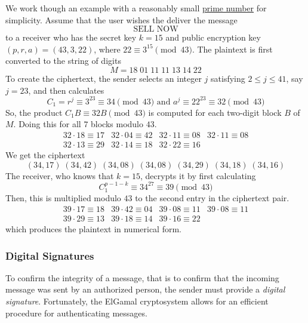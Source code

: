 \documentclass{article}
\newcounter{example}[section]
\begin{document}
We work though an example with a reasonably small \hyperref[def:prime-number]{prime number} for simplicity. Assume that the user wishes the deliver the message 
\begin{equation}
  \text{SELL NOW}
\end{equation}
to a receiver who has the secret key $k=15$ and public encryption key $(p, r, a) = (43, 3, 22)$, where $22 \equiv 3^{15} \pmod{43}$. The plaintext is first converted to the string of digits 
\begin{equation}
  M = 18\;01\;11\;11\;13\;14\;22
\end{equation}
To create the ciphertext, the sender selects an integer $j$ satisfying $2 \leq j \leq 41$, say $j=23$, and then calculates
\begin{equation}
  C_1 = r^j \equiv 3^{23} \equiv 34 \pmod{43} \text{ and } a^j \equiv 22^{23} \equiv 32 \pmod{43}
\end{equation}
So, the product $C_1 B \equiv 32 B \pmod{43}$ is computed for each two-digit block $B$ of $M$. Doing this for all $7$ blocks modulo $43$. 
\begin{equation}
  \begin{array}{cccc}
      32 \cdot 18 \equiv 17 & 32 \cdot 04 \equiv 42 & 32 \cdot 11 \equiv 08 & 32 \cdot 11 \equiv 08 \\
      32 \cdot 13 \equiv 29 & 32 \cdot 14 \equiv 18 & 32 \cdot 22 \equiv 16
  \end{array}
\end{equation}
We get the ciphertext 
\begin{equation}
  (34,17)\;(34,42)\;(34,08)\;(34,08)\;(34,29)\;(34,18)\;(34,16)
\end{equation}
The receiver, who knows that $k = 15$, decrypts it by first calculating
\begin{equation}
  C_1^{p-1-k} \equiv 34^{27} \equiv 39 \pmod{43}
\end{equation}
Then, this is multiplied modulo $43$ to the second entry in the ciphertext pair. 
\begin{equation}
  \begin{array}{cccc}
      39 \cdot 17 \equiv 18 & 39 \cdot 42 \equiv 04 & 39 \cdot 08 \equiv 11 & 39 \cdot 08 \equiv 11 \\
      39 \cdot 29 \equiv 13 & 39 \cdot 18 \equiv 14 & 39 \cdot 16 \equiv 22
  \end{array}
\end{equation}
which produces the plaintext in numerical form. 

\subsubsection{Digital Signatures}
To confirm the integrity of a message, that is to confirm that the incoming message was sent by an authorized person, the sender must provide a \textit{digital signature}. Fortunately, the ElGamal cryptosystem allows for an efficient procedure for authenticating messages. 
\end{document}

